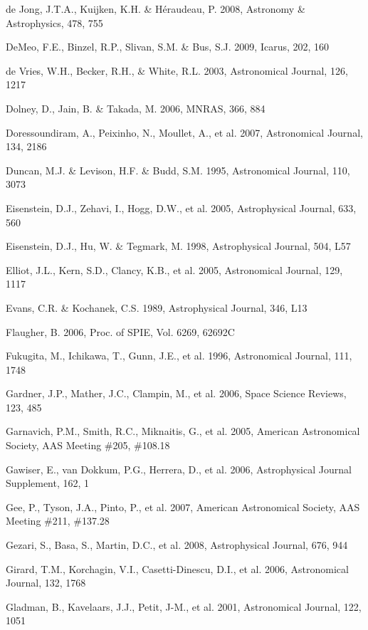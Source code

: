 \documentclass{emulateapj}
\begin{document}
\begin{thebibliography}{}
\bibitem[()]{} de Jong, J.T.A., Kuijken, K.H. \& H\'{e}raudeau, P. 2008, Astronomy \& 
             Astrophysics, 478, 755

\bibitem[()]{} DeMeo, F.E., Binzel, R.P., Slivan, S.M. \& Bus, S.J. 2009, Icarus, 202, 160

\bibitem[()]{} de Vries, W.H., Becker, R.H., \& White, R.L. 2003, Astronomical Journal, 126, 1217

\bibitem[()]{} Dolney, D., Jain, B. \& Takada, M. 2006, MNRAS, 366, 884

\bibitem[()]{} Doressoundiram, A., Peixinho, N., Moullet, A., et al. 2007, Astronomical Journal, 134, 2186

\bibitem[()]{} Duncan, M.J. \& Levison, H.F. \& Budd, S.M. 1995, Astronomical Journal, 110, 3073

\bibitem[()]{} Eisenstein, D.J., Zehavi, I., Hogg, D.W., et al. 2005, Astrophysical Journal, 633, 560

\bibitem[()]{} Eisenstein, D.J., Hu, W. \& Tegmark, M. 1998, Astrophysical Journal, 504, L57

\bibitem[()]{} Elliot, J.L., Kern, S.D., Clancy, K.B., et al. 2005,  Astronomical Journal, 129, 1117

\bibitem[()]{} Evans, C.R. \& Kochanek, C.S. 1989, Astrophysical Journal, 346, L13

\bibitem[()]{} Flaugher, B. 2006, Proc. of SPIE, Vol. 6269, 62692C

\bibitem[()]{} Fukugita, M., Ichikawa, T., Gunn, J.E., et al. 1996, Astronomical Journal, 111, 1748

\bibitem[()]{} Gardner, J.P., Mather, J.C., Clampin, M., et al. 2006, Space Science Reviews, 123, 485

\bibitem[()]{} Garnavich, P.M., Smith, R.C., Miknaitis, G., et al. 2005, 
             American Astronomical Society, AAS Meeting \#205, \#108.18 	

\bibitem[()]{} Gawiser, E., van Dokkum, P.G., Herrera, D., et al. 2006, Astrophysical Journal Supplement, 162, 1 

\bibitem[()]{} Gee, P., Tyson, J.A., Pinto, P., et al. 2007, 
             American Astronomical Society, AAS Meeting \#211, \#137.28
	
\bibitem[()]{} Gezari, S., Basa, S., Martin, D.C., et al. 2008, Astrophysical Journal, 676, 944

\bibitem[()]{} Girard, T.M., Korchagin, V.I., Casetti-Dinescu, D.I., et al. 2006, Astronomical 
             Journal, 132, 1768

\bibitem[()]{} Gladman, B., Kavelaars, J.J., Petit, J-M., et al. 2001, Astronomical Journal, 122, 1051


\end{thebibliography}
\end{document}
